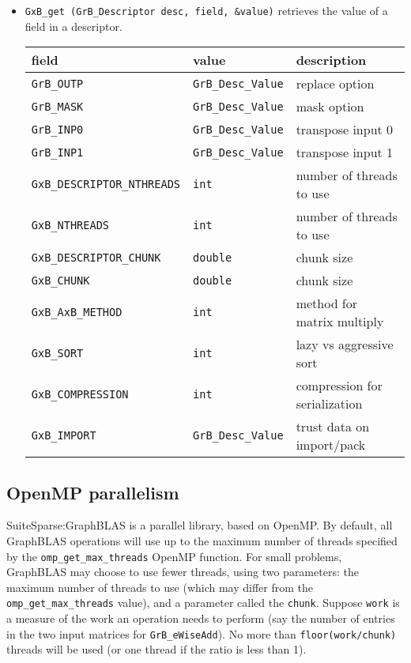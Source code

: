 \documentclass[12pt]{article}
\begin{document}
\begin{itemize}
\item \verb'GxB_get (GrB_Descriptor desc, field, &value)' retrieves the value
    of a field in a descriptor.

{\footnotesize
\begin{tabular}{lll}
field                       & value         & description \\
\hline
\verb'GrB_OUTP'     & \verb'GrB_Desc_Value' & replace option \\
\verb'GrB_MASK'     & \verb'GrB_Desc_Value' & mask option \\
\verb'GrB_INP0'     & \verb'GrB_Desc_Value' & transpose input 0 \\
\verb'GrB_INP1'     & \verb'GrB_Desc_Value' & transpose input 1 \\
\verb'GxB_DESCRIPTOR_NTHREADS'  & \verb'int' & number of threads to use \\
\verb'GxB_NTHREADS'             & \verb'int' & number of threads to use \\
\verb'GxB_DESCRIPTOR_CHUNK'     & \verb'double' & chunk size \\
\verb'GxB_CHUNK'                & \verb'double' & chunk size \\
\verb'GxB_AxB_METHOD'           & \verb'int' & method for matrix multiply \\
\verb'GxB_SORT'                 & \verb'int' & lazy vs aggressive sort \\
\verb'GxB_COMPRESSION'          & \verb'int' & compression for serialization \\
\verb'GxB_IMPORT'    & \verb'GrB_Desc_Value' & trust data on import/pack \\
\hline
\end{tabular}
}

\end{itemize}

\subsection{OpenMP parallelism}
\label{omp_parallelism}

SuiteSparse:GraphBLAS is a parallel library, based on OpenMP.  By
default, all GraphBLAS operations will use up to the maximum number of threads
specified by the \verb'omp_get_max_threads' OpenMP function.  For small
problems, GraphBLAS may choose to use fewer threads, using two parameters: the
maximum number of threads to use (which may differ from the
\verb'omp_get_max_threads' value), and a parameter called the \verb'chunk'.
Suppose \verb'work' is a measure of the work an operation needs to perform (say
the number of entries in the two input matrices for \verb'GrB_eWiseAdd').  No
more than \verb'floor(work/chunk)' threads will be used (or one thread if the
ratio is less than 1).
\end{document}
